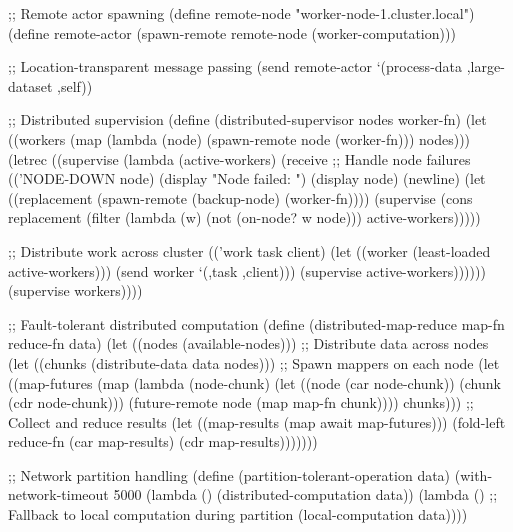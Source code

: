\begin{example}
\begin{lambdustcode}
;; Remote actor spawning
(define remote-node "worker-node-1.cluster.local")
(define remote-actor (spawn-remote remote-node (worker-computation)))

;; Location-transparent message passing
(send remote-actor `(process-data ,large-dataset ,self))

;; Distributed supervision  
(define (distributed-supervisor nodes worker-fn)
  (let ((workers (map (lambda (node) 
                        (spawn-remote node (worker-fn))) 
                      nodes)))
    (letrec ((supervise (lambda (active-workers)
                          (receive
                            ;; Handle node failures
                            (('NODE-DOWN node)
                             (display "Node failed: ") (display node) (newline)
                             (let ((replacement (spawn-remote (backup-node) (worker-fn))))
                               (supervise (cons replacement 
                                               (filter (lambda (w) (not (on-node? w node)))
                                                      active-workers)))))
                            
                            ;; Distribute work across cluster
                            (('work task client)
                             (let ((worker (least-loaded active-workers)))
                               (send worker `(,task ,client)))
                             (supervise active-workers))))))
      (supervise workers))))

;; Fault-tolerant distributed computation
(define (distributed-map-reduce map-fn reduce-fn data)
  (let ((nodes (available-nodes)))
    ;; Distribute data across nodes
    (let ((chunks (distribute-data data nodes)))
      ;; Spawn mappers on each node
      (let ((map-futures 
              (map (lambda (node-chunk)
                     (let ((node (car node-chunk))
                           (chunk (cdr node-chunk)))
                       (future-remote node (map map-fn chunk))))
                   chunks)))
        ;; Collect and reduce results
        (let ((map-results (map await map-futures)))
          (fold-left reduce-fn (car map-results) (cdr map-results)))))))

;; Network partition handling
(define (partition-tolerant-operation data)
  (with-network-timeout 5000
    (lambda ()
      (distributed-computation data))
    (lambda ()
      ;; Fallback to local computation during partition
      (local-computation data))))
\end{lambdustcode}
\end{example}


